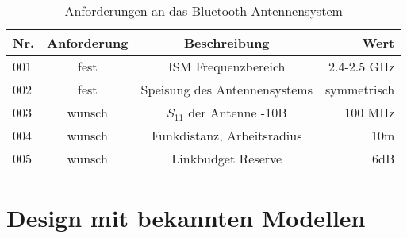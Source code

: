 
\begin{table}[!ht]
\centering
\begin{tabular}{lccr} \toprule 
Nr. & Anforderung & Beschreibung & Wert   \\ 
\midrule
001 & fest & ISM Frequenzbereich  & 2.4-2.5 GHz  \\ 
002 & fest &  Speisung des Antennensystems & symmetrisch  \\  
003 & wunsch & $S_{11}$ der Antenne   -10B & 100 MHz  \\ 
004 & wunsch & Funkdistanz, Arbeitsradius & 10m   \\ 
005 & wunsch & Linkbudget Reserve & 6dB   \\ 
\bottomrule
  \end{tabular}
  \caption{Anforderungen an das Bluetooth Antennensystem}
  \label{AnforderungenAntenneSystem}
\end{table} 

\section{Design mit bekannten Modellen}

